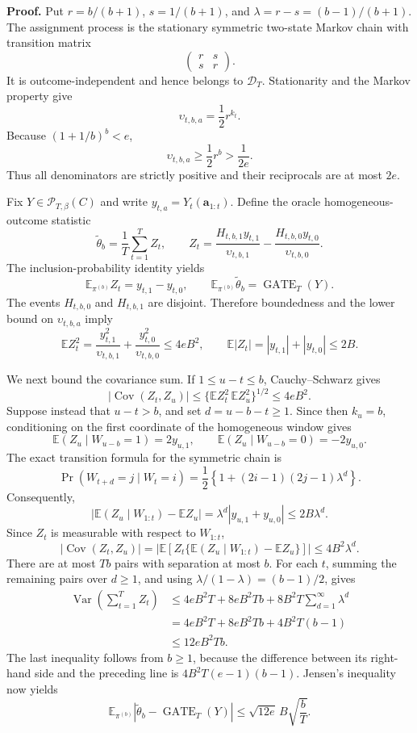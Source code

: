 \textbf{Proof.} Put \(r=b/(b+1)\), \(s=1/(b+1)\), and \(\lambda=r-s=(b-1)/(b+1)\). The assignment process is the stationary symmetric two-state Markov chain with transition matrix
\[
\begin{pmatrix}r&s\\s&r\end{pmatrix}.
\]
It is outcome-independent and hence belongs to \(\mathcal D_T\). Stationarity and the Markov property give
\[
\upsilon_{t,b,a}=\frac12r^{k_t}.
\]
Because \((1+1/b)^b<e\),
\[
\upsilon_{t,b,a}\ge \frac12r^b>\frac{1}{2e}.
\]
Thus all denominators are strictly positive and their reciprocals are at most \(2e\).

Fix \(Y\in\mathcal P_{T,\beta}(C)\) and write \(y_{t,a}=Y_t(\mathbf a_{1:t})\). Define the oracle homogeneous-outcome statistic
\[
\widetilde\theta_b=\frac1T\sum_{t=1}^T Z_t,
\qquad
Z_t=\frac{H_{t,b,1}y_{t,1}}{\upsilon_{t,b,1}}-\frac{H_{t,b,0}y_{t,0}}{\upsilon_{t,b,0}}.
\]
The inclusion-probability identity yields
\[
\mathbb E_{\pi^{(b)}}Z_t=y_{t,1}-y_{t,0},
\qquad
\mathbb E_{\pi^{(b)}}\widetilde\theta_b=\operatorname{GATE}_T(Y).
\]
The events \(H_{t,b,0}\) and \(H_{t,b,1}\) are disjoint. Therefore boundedness and the lower bound on \(\upsilon_{t,b,a}\) imply
\[
\mathbb E Z_t^2
=\frac{y_{t,1}^2}{\upsilon_{t,b,1}}+\frac{y_{t,0}^2}{\upsilon_{t,b,0}}
\le 4eB^2,
\qquad
\mathbb E|Z_t|=|y_{t,1}|+|y_{t,0}|\le2B.
\]

We next bound the covariance sum. If \(1\le u-t\le b\), Cauchy--Schwarz gives
\[
|\operatorname{Cov}(Z_t,Z_u)|
\le \{\mathbb E Z_t^2\,\mathbb E Z_u^2\}^{1/2}
\le4eB^2.
\]
Suppose instead that \(u-t>b\), and set \(d=u-b-t\ge1\). Since then \(k_u=b\), conditioning on the first coordinate of the homogeneous window gives
\[
\mathbb E(Z_u\mid W_{u-b}=1)=2y_{u,1},
\qquad
\mathbb E(Z_u\mid W_{u-b}=0)=-2y_{u,0}.
\]
The exact transition formula for the symmetric chain is
\[
\Pr(W_{t+d}=j\mid W_t=i)
=\frac12\left\{1+(2i-1)(2j-1)\lambda^d\right\}.
\]
Consequently,
\[
\left|\mathbb E(Z_u\mid W_{1:t})-\mathbb EZ_u\right|
=\lambda^d|y_{u,1}+y_{u,0}|
\le2B\lambda^d.
\]
Since \(Z_t\) is measurable with respect to \(W_{1:t}\),
\[
|\operatorname{Cov}(Z_t,Z_u)|
=\left|\mathbb E\left[Z_t\{\mathbb E(Z_u\mid W_{1:t})-\mathbb EZ_u\}\right]\right|
\le4B^2\lambda^d.
\]
There are at most \(Tb\) pairs with separation at most \(b\). For each \(t\), summing the remaining pairs over \(d\ge1\), and using \(\lambda/(1-\lambda)=(b-1)/2\), gives
\[
\begin{aligned}
\operatorname{Var}\left(\sum_{t=1}^T Z_t\right)
&\le4eB^2T+8eB^2Tb+8B^2T\sum_{d=1}^{\infty}\lambda^d\\
&=4eB^2T+8eB^2Tb+4B^2T(b-1)\\
&\le12eB^2Tb.
\end{aligned}
\]
The last inequality follows from \(b\ge1\), because the difference between its right-hand side and the preceding line is \(4B^2T(e-1)(b-1)\). Jensen's inequality now yields
\[
\mathbb E_{\pi^{(b)}}\left|\widetilde\theta_b-\operatorname{GATE}_T(Y)\right|
\le\sqrt{12e}\,B\sqrt{\frac bT}.
\]

